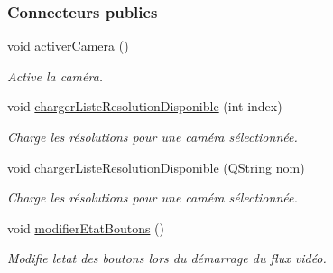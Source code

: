 \subsubsection*{Connecteurs publics}
\begin{DoxyCompactItemize}
\item 
void \hyperlink{class_i_h_m_reglage_video_a7e5c5d7515a6c745dfde5c3ad3b61a66}{activer\+Camera} ()
\begin{DoxyCompactList}\small\item\em Active la caméra. \end{DoxyCompactList}\item 
void \hyperlink{class_i_h_m_reglage_video_a26dc15cf9453af24c464f0d6aebb42df}{charger\+Liste\+Resolution\+Disponible} (int index)
\begin{DoxyCompactList}\small\item\em Charge les résolutions pour une caméra sélectionnée. \end{DoxyCompactList}\item 
void \hyperlink{class_i_h_m_reglage_video_a25c0537f7d5b735f80f46f2ae993f424}{charger\+Liste\+Resolution\+Disponible} (Q\+String nom)
\begin{DoxyCompactList}\small\item\em Charge les résolutions pour une caméra sélectionnée. \end{DoxyCompactList}\item 
void \hyperlink{class_i_h_m_reglage_video_ac838581ba03f52e79064cb91ebabb35d}{modifier\+Etat\+Boutons} ()
\begin{DoxyCompactList}\small\item\em Modifie l\textquotesingle{}etat des boutons lors du démarrage du flux vidéo. \end{DoxyCompactList}\end{DoxyCompactItemize}
